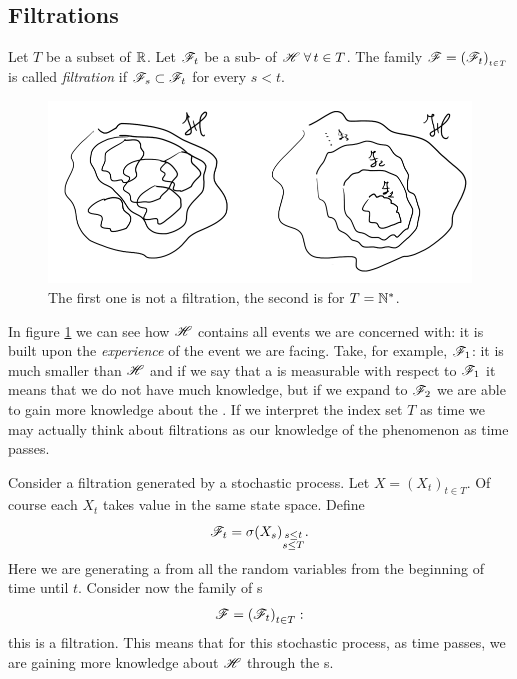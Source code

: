 \documentclass{report}
\begin{document}
\subsection{Filtrations}
Let $T$ be a subset of $\mathbb{R}$. Let $\mathscr{F}_t$ be a sub-\sa{} of $\mathscr{H}\;\forall\, t\in T$. The family $\mathscr{F}=(\mathscr{F}_t)_{_{t\in T}}$ is called \emph{filtration} if $\mathscr{F}_s\subset\mathscr{F}_t$ for every $s<t$.
\begin{figure}[h]
	\centering
	\includegraphics[width=.7\linewidth]{filtration}
	\caption{The first one is not a filtration, the second is for $T=\mathbb{N}^{*}$.}
	\label{fig:filtration}
\end{figure}
In figure \ref{fig:filtration} we can see how $\mathscr{H}$ contains all events we are concerned with: it is built upon the \textit{experience} of the event we are facing. Take, for example, $\mathscr{F}_1$: it is much smaller than $\mathscr{H}$ and if we say that a \rv{} is measurable with respect to $\mathscr{F}_1$ it means that we do not have much knowledge, but if we expand to $\mathscr{F}_2$ we are able to gain more knowledge about the \rv. If we interpret the index set $T$ as time we may actually think about filtrations as our knowledge of the phenomenon as time passes.
\begin{example}
	Consider a filtration generated by a stochastic process.
	Let $X={(X_{t})}_{t\in T}$. Of course each $X_t$ takes value in the same state space. Define
	\[\mathscr{F}_t=\sigma{(X_s)}_{\substack{s\leq t\\s\leq T}}.\]
	Here we are generating a \sa{} from all the random variables from the beginning of time until $t$. Consider now the family of \sa{}s 
	\[\mathscr{F}={(\mathscr{F}_t)}_{t\in T}:\]
	this is a filtration. This means that for this stochastic process, as time passes, we are gaining more knowledge about $\mathscr{H}$ through the \sa s.
\end{example}
\end{document}
